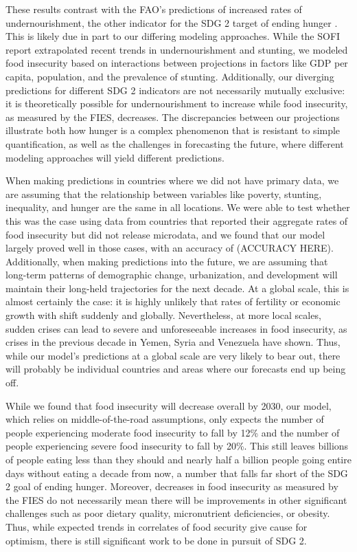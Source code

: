 \documentclass{article}
\begin{document}
These results contrast with the FAO's predictions of increased rates of undernourishment, the other indicator for the SDG 2 target of ending hunger \citep[Part 1, Page 11]{sofi2020}.  This is likely due in part to our differing modeling approaches. While the SOFI report extrapolated recent trends in undernourishment and stunting, we modeled food insecurity based on interactions between projections in factors like GDP per capita, population, and the prevalence of stunting. Additionally, our diverging predictions for different SDG 2 indicators are not necessarily mutually exclusive: it is theoretically possible for undernourishment to increase while food insecurity, as measured by the FIES, decreases.  The discrepancies between our projections illustrate both how hunger is a complex phenomenon that is resistant to simple quantification, as well as the challenges in forecasting the future, where different modeling approaches will yield different predictions.

When making predictions in countries where we did not have primary data, we are assuming that the relationship between variables like poverty, stunting, inequality, and hunger are the same in all locations.  We were able to test whether this was the case using data from countries that reported their aggregate rates of food insecurity but did not release microdata, and we found that our model largely proved well in those cases, with an accuracy of (ACCURACY HERE).  Additionally, when making predictions into the future, we are assuming that long-term patterns of demographic change, urbanization, and development will maintain their long-held trajectories for the next decade.  At a global scale, this is almost certainly the case: it is highly unlikely that rates of fertility or economic growth with shift suddenly and globally.  Nevertheless, at more local scales, sudden crises can lead to severe and unforeseeable increases in food insecurity, as crises in the previous decade in Yemen, Syria and Venezuela have shown.  Thus, while our model's predictions at a global scale are very likely to bear out, there will probably be individual countries and areas where our forecasts end up being off.

While we found that food insecurity will decrease overall by 2030, our model, which relies on middle-of-the-road assumptions, only expects the number of people experiencing moderate food insecurity to fall by 12\% and the number of people experiencing severe food insecurity to fall by 20\%.  This still leaves billions of people eating less than they should and nearly half a billion people going entire days without eating a decade from now, a number that falls far short of the SDG 2 goal of ending hunger.  Moreover, decreases in food insecurity as measured by the FIES do not necessarily mean there will be improvements in other significant challenges such as poor dietary quality, micronutrient deficiencies, or obesity.  Thus, while expected trends in correlates of food security give cause for optimism, there is still significant work to be done in pursuit of SDG 2.
\end{document}
